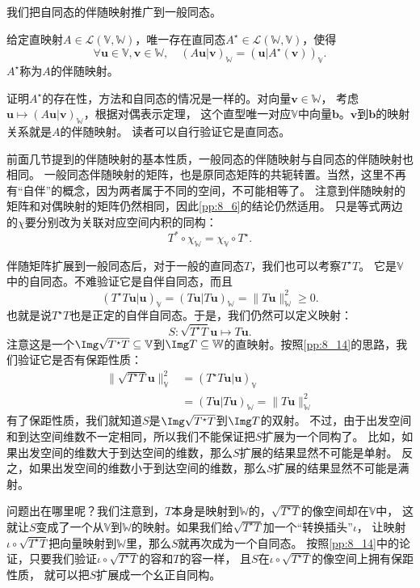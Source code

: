 \documentclass[12pt,UTF8,fontset=none]{ctexbook}
\begin{document}
我们把自同态的伴随映射推广到一般同态。
\begin{pp}\label{pp:8_16}
    给定直映射$A\in\mathcal{L}(\mathbb{V}, \mathbb{W})$，唯一存在直同态$A^\star \in \mathcal{L}(\mathbb{W}, \mathbb{V})$，使得
    $$ \forall \mathbf{u}\in\mathbb{V}, \mathbf{v}\in\mathbb{W}, \quad (A\mathbf{u} | \mathbf{v})_\mathbb{W} = (\mathbf{u} | A^\star(\mathbf{v}))_\mathbb{V}. $$
    $A^\star$称为$A$的伴随映射。
\end{pp}
证明$A^\star$的存在性，方法和自同态的情况是一样的。对向量$\mathbf{v}\in\mathbb{W}$，
考虑$\mathbf{u} \mapsto (A\mathbf{u}|\mathbf{v})_\mathbb{W}$，根据对偶表示定理，
这个直型唯一对应$\mathbb{V}$中向量$\mathbf{b}$。$\mathbf{v}$到$\mathbf{b}$的映射关系就是$A$的伴随映射。
读者可以自行验证它是直同态。

前面几节提到的伴随映射的基本性质，一般同态的伴随映射与自同态的伴随映射也相同。
一般同态伴随映射的矩阵，也是原同态矩阵的共轭转置。当然，这里不再有“自伴”的概念，因为两者属于不同的空间，不可能相等了。
注意到伴随映射的矩阵和对偶映射的矩阵仍然相同，因此\ref{pp:8_6}的结论仍然适用。
只是等式两边的$\chi$要分别改为关联对应空间内积的同构：
$$ T^* \circ \chi_\mathbb{W} = \chi_\mathbb{V} \circ T^\star. $$

伴随矩阵扩展到一般同态后，对于一般的直同态$T$，我们也可以考察$T^\star T$。
它是$\mathbb{V}$中的自同态。不难验证它是自伴自同态，而且
$$ (T^\star T\mathbf{u}|\mathbf{u})_\mathbb{V} = (T\mathbf{u}|T\mathbf{u})_\mathbb{W} = \| T\mathbf{u} \|_\mathbb{W}^2 \geqslant 0. $$
也就是说$T^\star T$也是正定的自伴自同态。于是，我们仍然可以定义映射：
$$ S : \sqrt{T^\star T} \mathbf{u} \mapsto T\mathbf{u}. $$
注意这是一个$\Img \sqrt{T^\star T}\subseteq\mathbb{V}$到$\Img T\subseteq\mathbb{W}$的直映射。按照\ref{pp:8_14}的思路，我们验证它是否有保距性质：
\begin{align*}
    \|\sqrt{T^\star T} \mathbf{u}\|_\mathbb{V}^2 &= (T^\star T\mathbf{u}|\mathbf{u})_\mathbb{V}  \\
    &= (T\mathbf{u}|T\mathbf{u})_\mathbb{W} = \| T\mathbf{u} \|_\mathbb{W}^2  
\end{align*}
有了保距性质，我们就知道$S$是$\Img \sqrt{T^\star T}$到$\Img T$的双射。
不过，由于出发空间和到达空间维数不一定相同，所以我们不能保证把$S$扩展为一个同构了。
比如，如果出发空间的维数大于到达空间的维数，那么$S$扩展的结果显然不可能是单射。
反之，如果出发空间的维数小于到达空间的维数，那么$S$扩展的结果显然不可能是满射。

问题出在哪里呢？我们注意到，$T$本身是映射到$\mathbb{W}$的，$\sqrt{T^\star T}$的像空间却在$\mathbb{V}$中，
这就让$S$变成了一个从$\mathbb{V}$到$\mathbb{W}$的映射。如果我们给$\sqrt{T^\star T}$加一个“转换插头”$\iota$，
让映射$\iota \circ \sqrt{T^\star T}$把向量映射到$\mathbb{W}$里，那么$S$就再次成为一个自同态。
按照\ref{pp:8_14}中的论证，只要我们验证$\iota \circ \sqrt{T^\star T}$的容和$T$的容一样，
且$S$在$\iota \circ \sqrt{T^\star T}$的像空间上拥有保距性质，
就可以把$S$扩展成一个幺正自同构。
\end{document}
